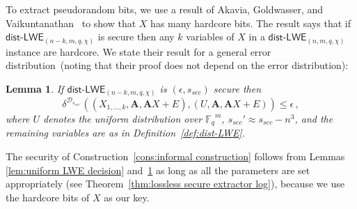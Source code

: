 \documentclass[11pt]{article}
\newcommand{\thref}[1]{\mbox{Theorem~\ref{#1}}}
\newcommand{\defref}[1]{\mbox{Definition~\ref{#1}}}
\newcommand{\lemref}[1]{\mbox{Lemma~\ref{#1}}}
\newcommand{\consref}[1]{\mbox{Construction~\ref{#1}}}
\newcommand{\class}[1]{{\ensuremath{\mathsf{#1}}}}
\newcommand{\vect}[1]{\ensuremath{\textbf{#1}}}
\newcommand{\Fq}{\ensuremath{\mathbb{F}_q}}
\newcommand{\unp}{\ensuremath{\mathtt{unp}}\xspace}
\newcommand{\poly}{\ensuremath{\mathtt{poly}}\xspace}
\newcommand{\ngl}{\ensuremath{\mathtt{ngl}}\xspace}
\newcommand{\distLWE}{\ensuremath{\class{dist\mbox{-}LWE}}}
\newtheorem{lemma}[theorem]{Lemma}
\newcommand{\vA}{\vect{A}}
\begin{document}
To extract pseudorandom bits, we use a result of Akavia, Goldwasser, and Vaikuntanathan~\cite{akavia2009} to show that $X$ has many hardcore bits.  The result says that if $\distLWE_{(n-k, m, q, \chi)}$ is secure then any $k$ variables of $X$ in a $\distLWE_{(n, m, q, \chi)}$ instance are hardcore.  We state their result for a general error distribution~(noting that their proof does not depend on the error distribution):
\begin{lemma}
\label{lem:many hardcore bits}
 If $\distLWE_{(n-k, m, q, \chi)}$ is $(\epsilon, s_{sec})$ secure then
\[\delta^ {\mathcal{D}_{s_{sec'}}} ((X_{1,..., k}, \vA, \vA X+E) , (U, \vA, \vA X+E)) \le \epsilon\,,\]
where $U$ denotes the uniform distribution over $\Fq^m$,  $s_{sec}' \approx s_{sec} - n^3$, and the remaining variables are as in \defref{def:dist-LWE}.
\end{lemma}



The security of  \consref{cons:informal construction} follows from Lemmas \ref{lem:uniform LWE decision} and~\ref{lem:many hardcore bits} as long as all the parameters are set appropriately (see \thref{thm:lossless secure extractor log}),  because we use the hardcore bits of $X$ as our key.  
\end{document}
